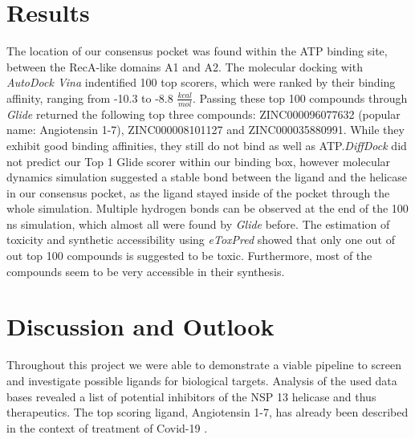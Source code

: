 \documentclass[11pt, letterpaper, titlepage]{article}
\renewcommand{\cite}{\parencite}
\begin{document}
\section{Results}
The location of our consensus pocket was found within the ATP binding site, between the RecA-like domains A1 and A2. The molecular docking with \textit{AutoDock Vina} indentified 100 top scorers, which were ranked by their binding affinity, ranging from -10.3 to -8.8 $\frac{kcal}{mol}$. Passing these top 100 compounds through \textit{Glide} returned the following top three compounds: ZINC000096077632 (popular name: Angiotensin 1-7), ZINC000008101127 and ZINC000035880991. While they exhibit good binding affinities, they still do not bind as well as ATP.\textit{DiffDock} did not predict our Top 1 Glide scorer within our binding box, however  molecular dynamics simulation suggested a stable bond between the ligand and the helicase in our consensus pocket, as the ligand stayed inside of the pocket through the whole simulation. Multiple hydrogen bonds can be observed at the end of the 100 ns simulation, which almost all were found by \textit{Glide} before. The estimation of toxicity and synthetic accessibility using \textit{eToxPred} showed that only one out of out top 100 compounds is suggested to be toxic. Furthermore, most of the compounds seem to be very accessible in their synthesis.\\ 

\FloatBarrier

\section{Discussion and Outlook}
Throughout this project we were able to demonstrate a viable pipeline to screen and investigate possible ligands for biological targets. Analysis of the used data bases revealed a list of potential inhibitors of the NSP 13 helicase and thus therapeutics. The top scoring ligand, Angiotensin 1-7, has already been described in the context of treatment of Covid-19 \cite{angio}. 


\pagebreak
\FloatBarrier
\renewcommand{\bibname}{References}  %
\printbibliography
\end{document}
